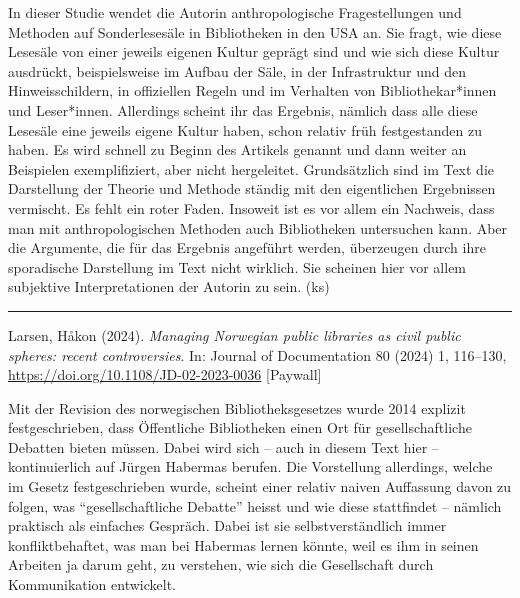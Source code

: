 \documentclass[a4paper,
fontsize=11pt,
oneside,
numbers=noperiodatend,
parskip=half-,
bibliography=totoc,
final
]{scrartcl}
\begin{document}
In dieser Studie wendet die Autorin anthropologische Fragestellungen und
Methoden auf Sonderlesesäle in Bibliotheken in den USA an. Sie fragt,
wie diese Lesesäle von einer jeweils eigenen Kultur geprägt sind und wie
sich diese Kultur ausdrückt, beispielsweise im Aufbau der Säle, in der
Infrastruktur und den Hinweisschildern, in offiziellen Regeln und im
Verhalten von Bibliothekar*innen und Leser*innen. Allerdings scheint ihr
das Ergebnis, nämlich dass alle diese Lesesäle eine jeweils eigene
Kultur haben, schon relativ früh festgestanden zu haben. Es wird schnell
zu Beginn des Artikels genannt und dann weiter an Beispielen
exemplifiziert, aber nicht hergeleitet. Grundsätzlich sind im Text die
Darstellung der Theorie und Methode ständig mit den eigentlichen
Ergebnissen vermischt. Es fehlt ein roter Faden. Insoweit ist es vor
allem ein Nachweis, dass man mit anthropologischen Methoden auch
Bibliotheken untersuchen kann. Aber die Argumente, die für das Ergebnis
angeführt werden, überzeugen durch ihre sporadische Darstellung im Text
nicht wirklich. Sie scheinen hier vor allem subjektive Interpretationen
der Autorin zu sein. (ks)

\begin{center}\rule{0.5\linewidth}{0.5pt}\end{center}

Larsen, Håkon (2024). \emph{Managing Norwegian public libraries as civil
public spheres: recent controversies}. In: Journal of Documentation 80
(2024) 1, 116--130, \url{https://doi.org/10.1108/JD-02-2023-0036}
{[}Paywall{]}

Mit der Revision des norwegischen Bibliotheksgesetzes wurde 2014
explizit festgeschrieben, dass Öffentliche Bibliotheken einen Ort für
gesellschaftliche Debatten bieten müssen. Dabei wird sich -- auch in
diesem Text hier -- kontinuierlich auf Jürgen Habermas berufen. Die
Vorstellung allerdings, welche im Gesetz festgeschrieben wurde, scheint
einer relativ naiven Auffassung davon zu folgen, was
\enquote{gesellschaftliche Debatte} heisst und wie diese stattfindet --
nämlich praktisch als einfaches Gespräch. Dabei ist sie
selbstverständlich immer konfliktbehaftet, was man bei Habermas lernen
könnte, weil es ihm in seinen Arbeiten ja darum geht, zu verstehen, wie
sich die Gesellschaft durch Kommunikation entwickelt.
\end{document}
